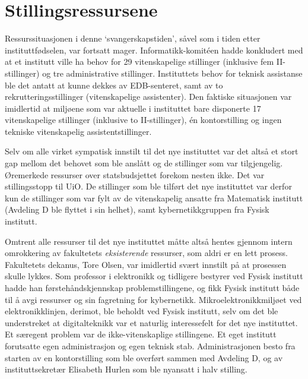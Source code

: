 \section{Stillingsressursene}

Ressurssituasjonen i denne `svangerskapstiden', såvel som i tiden etter instituttfødselen, var fortsatt mager. Informatikk-komitéen hadde konkludert med at et institutt ville ha behov for 29 vitenskapelige stillinger (inklusive fem II-stillinger) og tre administrative stillinger. Instituttets behov for teknisk assistanse ble det antatt at kunne dekkes av EDB-senteret, samt av to rekrutteringsstillinger (vitenskapelige assistenter). Den faktiske situasjonen var imidlertid at miljøene som var aktuelle i instituttet bare disponerte 17 vitenskapelige stillinger (inklusive to II-stillinger), én kontorstilling og ingen tekniske vitenskapelig assistentstillinger. 

Selv om alle virket sympatisk innstilt til det nye instituttet var det altså et stort gap mellom det behovet som ble anslått og de stillinger som var tilgjengelig. Øremerkede ressurser over statsbudsjettet forekom nesten ikke. Det var stillingsstopp til UiO. De stillinger som ble tilført det nye instituttet var derfor kun de stillinger som var fylt av de vitenskapelig ansatte fra Matematisk institutt (Avdeling D ble flyttet i sin helhet), samt kybernetikkgruppen fra Fysisk institutt.

Omtrent alle ressurser til det nye instituttet måtte altså hentes gjennom intern omrokkering av fakultetets \textit{eksisterende} ressurser, som aldri er en lett prosess. Fakultetets dekanus, Tore Olsen, var imidlertid svært innstilt på at prosessen skulle lykkes. Som professor i elektronikk og tidligere bestyrer ved Fysisk institutt hadde han førstehåndskjennskap problemstillingene, og fikk Fysisk institutt både til å avgi ressurser og sin fagretning for kybernetikk. Mikroelektronikkmiljøet ved elektronikklinjen, derimot, ble beholdt ved Fysisk institutt, selv om det ble understreket at digitalteknikk var et naturlig interessefelt for det nye instituttet. Et særegent problem var de ikke-vitenskaplige stillingene. Et eget institutt forutsatte egen administrasjon og egen teknisk stab. Administrasjonen besto fra starten av en kontorstilling som ble overført sammen med Avdeling D, og av instituttsekretær Elisabeth Hurlen som ble nyansatt i halv stilling.

